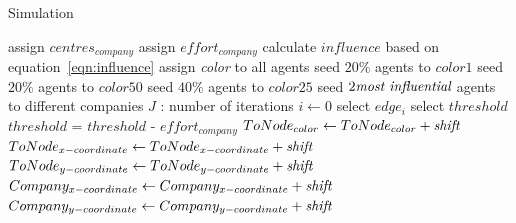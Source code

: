 \begin{algorithm}
\caption{Simulation}
\label{alg2}
\begin{algorithmic}
\STATE assign $centres_{company}$
\STATE assign $effort_{company}$
\STATE calculate $influence$ based on equation~\ref{eqn:influence}
\STATE assign \emph{color} to all agents
\STATE seed $20\% $ agents to $color1$
\STATE seed $20\%$ agents to $color50$
\STATE seed $40\%$ agents to $color25$
\STATE seed $2 \emph{most influential}$ agents to different companies
\STATE $J$ : number of iterations
\STATE $i \gets 0$
	\STATE select $edge_i$
		\STATE select $threshold$
		\STATE $threshold$ = $threshold$ - $effort_{company}$
			\STATE $ToNode_{color} \gets ToNode_{color} + \emph{shift}$
			\STATE $ToNode_{x-coordinate} \gets ToNode_{x-coordinate} + \emph{shift}$
			\STATE $ToNode_{y-coordinate} \gets ToNode_{y-coordinate} + \emph{shift}$
			\STATE $Company_{x-coordinate} \gets Company_{x-coordinate} + \emph{shift}$
			\STATE $Company_{y-coordinate} \gets Company_{y-coordinate} + \emph{shift}$
		\ENDIF
	\ENDIF
\ENDWHILE
\end{algorithmic}
\end{algorithm}

\clearpage